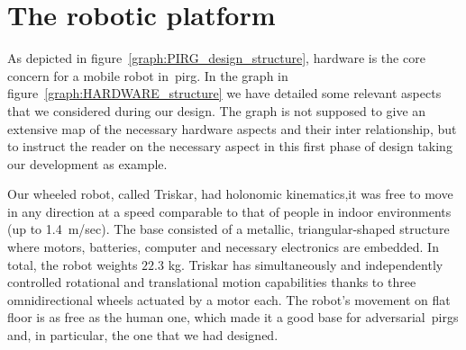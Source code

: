 \section{The robotic platform}\label{sec:roboplat} 
As depicted in figure~\ref{graph:PIRG_design_structure}, hardware is the core concern for a mobile robot in~\gls{pirg}. In the graph in figure~\ref{graph:HARDWARE_structure} we have detailed some relevant aspects that we considered during our design. The graph is not supposed to give an extensive map of the necessary hardware aspects and their inter relationship, but to instruct the reader on the necessary aspect in this first phase of design taking our development as example. %

Our wheeled robot, called Triskar, had holonomic kinematics,\ie it was free to move in any direction at a speed comparable to that of people in indoor environments (up to 1.4~m/sec). The base consisted of a metallic, triangular-shaped structure where motors, batteries, computer and necessary electronics are embedded. In total, the robot weights $22.3$ kg. Triskar has simultaneously and independently controlled rotational and translational motion capabilities thanks to three omnidirectional wheels actuated by a motor each. The robot's movement on flat floor is as free as the human one, which made it a good base for adversarial~\gls{pirg}s and, in particular, the one that we had designed. 


